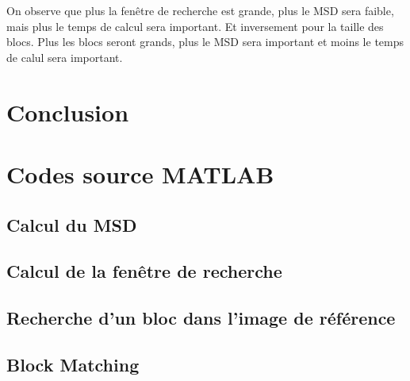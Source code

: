\documentclass[a4paper, 12pt]{article}
\newcommand{\FSource}[1]{%

}
\begin{document}
On observe que plus la fenêtre de recherche est grande, plus le MSD sera faible, mais plus le temps de calcul sera important. Et inversement pour la taille des blocs. Plus les blocs seront grands, plus le MSD sera important et moins le temps de calul sera important.



\newpage

\section{Conclusion}


\clearpage

%
%
\appendix

\section{Codes source MATLAB}

\subsection{Calcul du MSD}\label{msd_code}

\FSource{../compute_msd.m}

\newpage

\subsection{Calcul de la fenêtre de recherche}\label{search_window}

\FSource{../search_window.m}

\newpage

\subsection{Recherche d'un bloc dans l'image de référence}\label{block_search}

\FSource{../block_matching.m}

\newpage

\subsection{Block Matching}\label{block_matching}

\FSource{../block_matching_encode.m}
\end{document}
